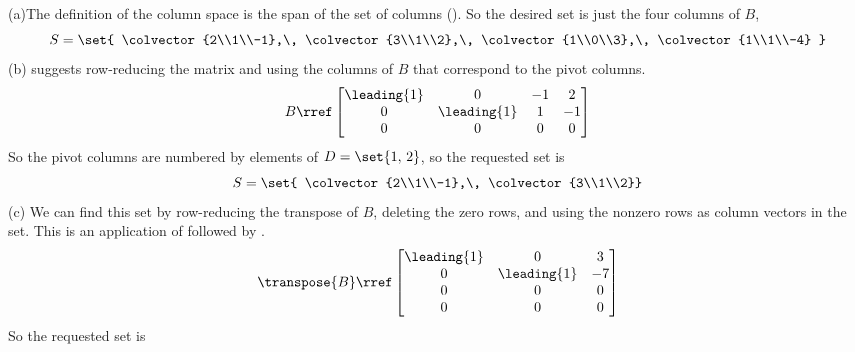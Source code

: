 (a)\quad The definition of the column space is the span of the set of columns ().  So the desired set is just the four columns of $B$,
%
\begin{equation*}
S=\set{
\colvector{2\\1\\-1},\,
\colvector{3\\1\\2},\,
\colvector{1\\0\\3},\,
\colvector{1\\1\\-4}
}
\end{equation*}
%
%
(b)\quad  
{} suggests row-reducing the matrix and using the columns of $B$ that correspond to the pivot columns.  
%
\begin{equation*}
B\rref
\begin{bmatrix}
\leading{1} & 0 & -1 & 2\\
0 & \leading{1} & 1 & -1\\
0 & 0 & 0 & 0
\end{bmatrix}
\end{equation*}
%
So the pivot columns are numbered by elements of $D=\set{1,\,2}$, so the requested set is
%
\begin{equation*}
S=\set{
\colvector{2\\1\\-1},\,
\colvector{3\\1\\2}}
\end{equation*}
%
(c)\quad 
We can find this set by row-reducing the transpose of $B$, deleting the zero rows, and using the nonzero rows as column vectors in the set.  This is an application of  followed by .
%
\begin{equation*}
\transpose{B}\rref
\begin{bmatrix}
\leading{1} & 0 & 3\\
0 & \leading{1} & -7\\
0 & 0 & 0\\
0 & 0 & 0
\end{bmatrix}
\end{equation*}
%
So the requested set is
%
